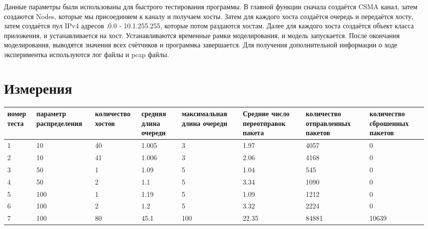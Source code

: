 \documentclass[a4peper, 12pt, titlepage, finall]{extreport}
\begin{document}
        Данные параметры были использованы для быстрого тестирования программы.
        В главной функции сначала создаётся CSMA канал, затем создаются Nodes, которые мы присоединяем к каналу и получаем хосты.
        Затем для каждого хоста создаётся очередь и передаётся хосту, затем создаётся пул IPv4 адресов {.0.0 - 10.1.255.255},
        которые потом раздаются хостам. Далее для каждого хоста создаётся объект класса приложения, и устанавливается на хост.
        Устанавливаются временные рамки моделирования, и модель запускается. После окончания моделирования, выводятся значения всех счётчиков и программка завершается.
        Для получения дополнительной информации о ходе экспериментка используются лог файлы и pcap файлы.
    \newpage
    \section{Измерения}
        
        \begin{table}[ht]
            \begin{tabular}{|m{1cm}|m{1.8cm}|m{2.3cm}|m{1.5cm}|m{2.6cm}|m{2.2cm}|m{2.2cm}|m{2.2cm}|}
                \hline
                \bf номер теста & \bf параметр распределения & \bf количество хостов &\bf средняя длина очереди & \bf максимальная длина очереди 
                & \bf Средние число переотправок пакета & \bf количество отправленных пакетов & \bf количество сброшенных пакетов \\
                \hline
                1 & 10 & 40 & 1.005 & 3 & 1.97 & 4057 & 0\\
                \hline
                2 & 10 & 41 & 1.006 & 3 & 2.06 & 4168 & 0\\
                \hline
                3 & 50 & 1 & 1.09 & 5 & 1.04 & 545 & 0\\
                \hline
                4 & 50 & 2 & 1.1 & 5 & 3.34 & 1090 & 0\\
                \hline
                5 & 100 & 1 & 1.19 & 5 & 1.09 & 1212 & 0\\
                \hline
                6 & 100 & 2 & 1.2 & 5 & 3.32 & 2224 & 0\\
                \hline
                7 & 100 & 80 & 45.1 & 100 & 22.35 & 84881 & 10639\\
                \hline
            \end{tabular}
        \end{table}
\end{document}
